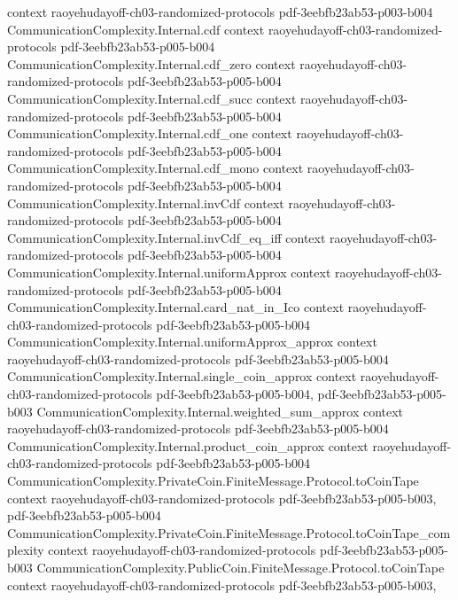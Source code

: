 \begin{theorem}
  {context}
  {raoyehudayoff-ch03-randomized-protocols}
  {pdf-3eebfb23ab53-p003-b004}
\proofstep
  {CommunicationComplexity.Internal.cdf}
  {context}
  {raoyehudayoff-ch03-randomized-protocols}
  {pdf-3eebfb23ab53-p005-b004}
\proofstep
  {CommunicationComplexity.Internal.cdf_zero}
  {context}
  {raoyehudayoff-ch03-randomized-protocols}
  {pdf-3eebfb23ab53-p005-b004}
\proofstep
  {CommunicationComplexity.Internal.cdf_succ}
  {context}
  {raoyehudayoff-ch03-randomized-protocols}
  {pdf-3eebfb23ab53-p005-b004}
\proofstep
  {CommunicationComplexity.Internal.cdf_one}
  {context}
  {raoyehudayoff-ch03-randomized-protocols}
  {pdf-3eebfb23ab53-p005-b004}
\proofstep
  {CommunicationComplexity.Internal.cdf_mono}
  {context}
  {raoyehudayoff-ch03-randomized-protocols}
  {pdf-3eebfb23ab53-p005-b004}
\proofstep
  {CommunicationComplexity.Internal.invCdf}
  {context}
  {raoyehudayoff-ch03-randomized-protocols}
  {pdf-3eebfb23ab53-p005-b004}
\proofstep
  {CommunicationComplexity.Internal.invCdf_eq_iff}
  {context}
  {raoyehudayoff-ch03-randomized-protocols}
  {pdf-3eebfb23ab53-p005-b004}
\proofstep
  {CommunicationComplexity.Internal.uniformApprox}
  {context}
  {raoyehudayoff-ch03-randomized-protocols}
  {pdf-3eebfb23ab53-p005-b004}
\proofstep
  {CommunicationComplexity.Internal.card_nat_in_Ico}
  {context}
  {raoyehudayoff-ch03-randomized-protocols}
  {pdf-3eebfb23ab53-p005-b004}
\proofstep
  {CommunicationComplexity.Internal.uniformApprox_approx}
  {context}
  {raoyehudayoff-ch03-randomized-protocols}
  {pdf-3eebfb23ab53-p005-b004}
\proofstep
  {CommunicationComplexity.Internal.single_coin_approx}
  {context}
  {raoyehudayoff-ch03-randomized-protocols}
  {pdf-3eebfb23ab53-p005-b004,
    pdf-3eebfb23ab53-p005-b003}
\proofstep
  {CommunicationComplexity.Internal.weighted_sum_approx}
  {context}
  {raoyehudayoff-ch03-randomized-protocols}
  {pdf-3eebfb23ab53-p005-b004}
\proofstep
  {CommunicationComplexity.Internal.product_coin_approx}
  {context}
  {raoyehudayoff-ch03-randomized-protocols}
  {pdf-3eebfb23ab53-p005-b004}
\proofstep
  {CommunicationComplexity.PrivateCoin.FiniteMessage.Protocol.toCoinTape}
  {context}
  {raoyehudayoff-ch03-randomized-protocols}
  {pdf-3eebfb23ab53-p005-b003,
    pdf-3eebfb23ab53-p005-b004}
\proofstep
  {CommunicationComplexity.PrivateCoin.FiniteMessage.Protocol.toCoinTape_complexity}
  {context}
  {raoyehudayoff-ch03-randomized-protocols}
  {pdf-3eebfb23ab53-p005-b003}
\proofstep
  {CommunicationComplexity.PublicCoin.FiniteMessage.Protocol.toCoinTape}
  {context}
  {raoyehudayoff-ch03-randomized-protocols}
  {pdf-3eebfb23ab53-p005-b003,
}
\end{theorem}
